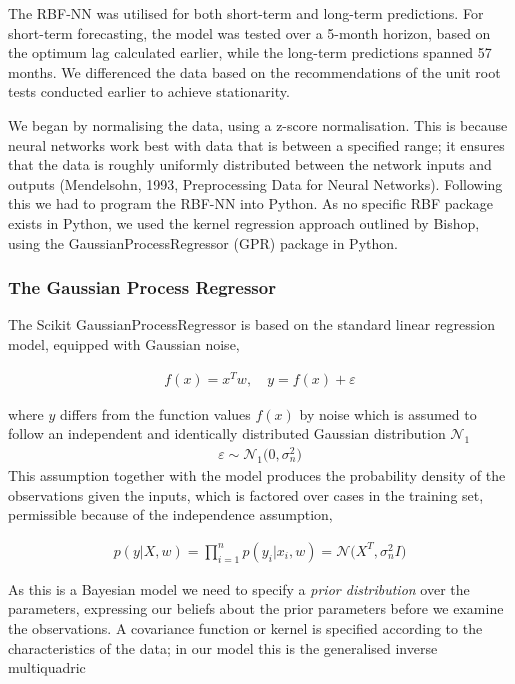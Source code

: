 \documentclass[11pt,a4paper]{article}
\begin{document}
The RBF-NN was utilised for both short-term and long-term 
predictions. For short-term forecasting, 
the model was tested over a 5-month horizon, based on the optimum lag calculated earlier, while the long-term predictions spanned 57 months. 
We differenced the data based on the recommendations of the 
unit root tests conducted earlier to achieve stationarity. 

We began by normalising the data, using a z-score normalisation. This is because
neural networks work best with data
that is between a specified range; it ensures that the data is roughly uniformly
distributed between the network inputs and outputs 
(Mendelsohn, 1993, Preprocessing Data for Neural Networks). Following this 
we had to program the RBF-NN into Python. As no specific RBF package exists
in Python, we used the kernel regression approach outlined by 
Bishop, using the GaussianProcessRegressor (GPR) package in Python.

\subsubsection{The Gaussian Process Regressor}

The Scikit GaussianProcessRegressor is based on the 
standard linear regression 
model, equipped with Gaussian noise,

\begin{align} 
    f(x) = x^{T}w, \quad{y = f(x) + \varepsilon}
\end{align}

where $y$ differs from the function values $f(x)$ by noise which is assumed
to follow an independent and identically distributed Gaussian distribution
$\mathcal{N}_1$
\begin{align*}
    \varepsilon \sim \mathcal{N}_1 \bigl(0, \sigma_{n}^2\bigr)
\end{align*}
This assumption together with the model produces the 
probability density of the observations given the inputs, 
which is factored over cases in the training set, 
permissible because of the independence assumption,

\begin{align}
    p(y|X,w) = \prod_{i=1}^{n} p(y_i|x_i ,w) = \mathcal{N}\bigl(X^T, \sigma_{n}^2 I\bigr)
\end{align}

As this is a Bayesian model we need to specify a \textit{prior distribution} over the parameters, 
expressing our beliefs about the prior
parameters before we examine the observations. A covariance function or kernel
is specified according to the characteristics of the data; in our model this 
is the generalised inverse multiquadric
\end{document}
